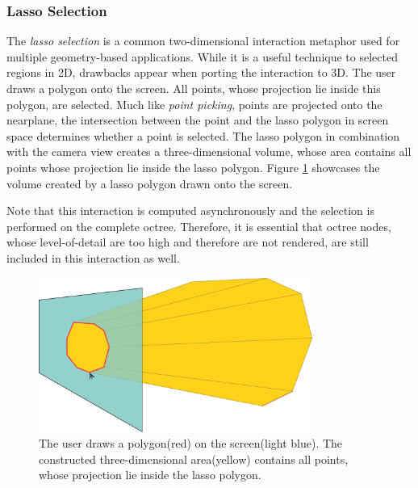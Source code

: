 \subsubsection{Lasso Selection}

The \textit{lasso selection} is a common two-dimensional interaction metaphor used for multiple geometry-based applications. While it is a useful technique to selected regions in 2D, drawbacks appear when porting the interaction to 3D. The user draws a polygon onto the screen. All points, whose projection lie inside this polygon, are selected. Much like \textit{point picking}, points are projected onto the nearplane, the intersection between the point and the lasso polygon in screen space determines whether a point is selected. The lasso polygon in combination with the camera view creates a three-dimensional volume, whose area contains all points whose projection lie inside the lasso polygon. Figure \ref{fig:lasso_sketch} showcases the volume created by a lasso polygon drawn onto the screen.

Note that this interaction is computed asynchronously and the selection is performed on the complete octree. Therefore, it is essential that octree nodes, whose level-of-detail are too high and therefore are not rendered, are still included in this interaction as well. 


\begin{figure}
    \centering
    \includegraphics[width=0.8\textwidth]{System_Design/lasso_sketch.png}%
    \caption[Illustration of the creation of a lasso selection]
		{The user draws a polygon(red) on the screen(light blue). The constructed three-dimensional area(yellow) contains all points, whose projection lie inside the lasso polygon. }
    \label{fig:lasso_sketch}
\end{figure}


